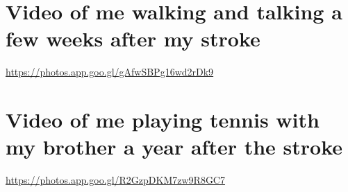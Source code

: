 \documentclass{article}
\begin{document}
\section{Video of me walking and talking a few weeks after my stroke}
\url{https://photos.app.goo.gl/gAfwSBPg16wd2rDk9}
\section{Video of me playing tennis with my brother a year after the stroke}
\url{https://photos.app.goo.gl/R2GzpDKM7zw9R8GC7}
\end{document}
